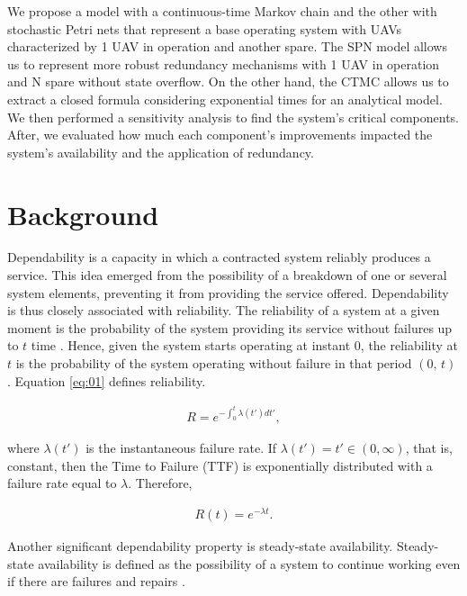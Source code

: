 \documentclass[conference]{IEEEtran}
\begin{document}
We propose a model with a continuous-time Markov chain and the other with stochastic Petri nets that represent a base operating system with UAVs characterized by 1 UAV in operation and another spare. The SPN model allows us to represent more robust redundancy mechanisms with 1 UAV in operation and N spare without state overflow. On the other hand, the CTMC allows us to extract a closed formula considering exponential times for an analytical model. We then performed a sensitivity analysis to find the system's critical components. After, we evaluated how much each component's improvements impacted the system's availability and the application of redundancy.

\section{Background}\label{sec:background}

 Dependability is a capacity in which a contracted system reliably produces a service. This idea emerged from the possibility of a breakdown of one or several system elements, preventing it from providing the service offered. Dependability is thus closely associated with reliability. The reliability of a system at a given moment is the probability of the system providing its service without failures up to $t$ time \citep{avizienis2004basic}. Hence, given the system starts operating at instant  $0$,  the reliability at $t$  is the probability of the system operating without failure in that period $(0, \,  t)$ \citep{trivedi2008probability,maciel_2023_vol2}. Equation \ref{eq:01} defines reliability.

\begin{align}\label{eq:01}
R = e^{-\int_{0}^{t} \lambda(t')dt'},
\end{align}

\noindent where $\lambda (t')$ is the instantaneous failure rate. If $\lambda (t') = t'\in (0,\infty)$, that is, constant, then the Time to Failure (TTF) is exponentially distributed with a failure rate equal to $\lambda$. Therefore,

\begin{align}
R(t) = e^{- \lambda t}.
\end{align}
 
Another significant dependability property is steady-state availability. Steady-state availability is defined as the possibility of a system to continue working even if there are failures and repairs \citep{trivedi2008probability}.
\end{document}
